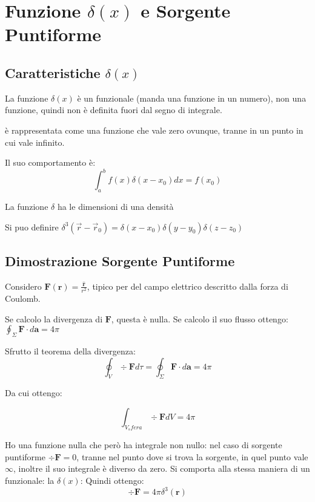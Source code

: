 \documentclass[a4paper]{scrarticle}
\begin{document}
\section{Funzione $\delta(x)$ e Sorgente Puntiforme}

\subsection{Caratteristiche $\delta(x)$}

La funzione $\delta(x)$ è un funzionale (manda una funzione in un numero), non una funzione, quindi non è definita fuori dal segno di integrale.

è rappresentata come una funzione che vale zero ovunque, tranne in un punto in cui vale infinito.

Il suo comportamento è:
\begin{equation*}
    \int_{a}^{b} f(x) \delta (x-x_0) dx = f(x_0)
\end{equation*}

La funzione $\delta$ ha le dimensioni di una densità

Si puo definire $\delta^3(\vec r - \vec r_0) = \delta(x-x_0)\delta(y-y_0)\delta(z-z_0)$

\subsection{Dimostrazione Sorgente Puntiforme}

Considero $\bm {F} (\bm r) = \frac{\hat {\bm{r}}}{r^2}$, tipico per del campo elettrico descritto dalla forza di Coulomb.

Se calcolo la divergenza di $\bm F$, questa è nulla.
Se calcolo il suo flusso ottengo: $\oint_{\Sigma} \bm {F} \cdot d \bm{a} = 4\pi$

Sfrutto il teorema della divergenza:
\begin{equation*}
    \oint_{V} \div{\bm{F}} d\tau = \oint_{\Sigma} \bm{F} \cdot d \bm{a} = 4\pi
\end{equation*}

Da cui ottengo:

\begin{equation*}
    \int_{V_sfera} \div {\bm F} dV = 4\pi
\end{equation*}

Ho una funzione nulla che però ha integrale non nullo:
nel caso di sorgente puntiforme $\div {\bm F} = 0$, tranne nel punto dove si trova la sorgente, in quel punto vale $\infty$, inoltre il suo integrale è diverso da zero. Si comporta alla stessa maniera di un funzionale: la $\delta(x)$:
Quindi ottengo:
\begin{equation*}
    \div{\bm{F}} = 4\pi \delta^3(\bm r)
\end{equation*}
\end{document}
